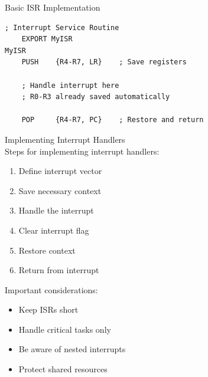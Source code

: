 \begin{example2}{Basic ISR Implementation}
\begin{lstlisting}[language=armasm, style=basesmol]
    ; Interrupt Service Routine
    EXPORT MyISR
MyISR
    PUSH    {R4-R7, LR}    ; Save registers
    
    ; Handle interrupt here
    ; R0-R3 already saved automatically
    
    POP     {R4-R7, PC}    ; Restore and return
\end{lstlisting}
\end{example2}

\begin{KR}{Implementing Interrupt Handlers}\\
Steps for implementing interrupt handlers:
\begin{enumerate}
  \item Define interrupt vector
  \item Save necessary context
  \item Handle the interrupt
  \item Clear interrupt flag
  \item Restore context
  \item Return from interrupt
\end{enumerate}

Important considerations:
\begin{itemize}
  \item Keep ISRs short
  \item Handle critical tasks only
  \item Be aware of nested interrupts
  \item Protect shared resources
\end{itemize}
\end{KR}

